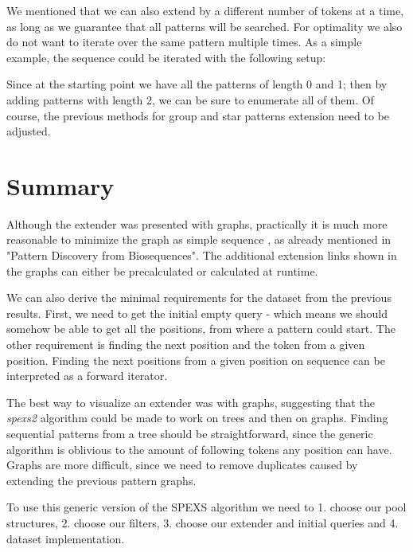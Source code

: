 We mentioned that we can also extend by a different number of tokens at a time, as long as we guarantee that all patterns will be searched. For optimality we also do not want to iterate over the same pattern multiple times. As a simple example, the sequence  could be iterated with the following setup:

\begin{figure}[H]
	
\end{figure}

Since at the starting point we have all the patterns of length 0 and 1; then by adding patterns with length 2, we can be sure to enumerate all of them. Of course, the previous methods for group and star patterns extension need to be adjusted.

\section{Summary}

Although the extender was presented with graphs, practically it is much more reasonable to minimize the graph as simple sequence , as already mentioned in "Pattern Discovery from Biosequences"\cite{spexs}. The additional extension links shown in the graphs can either be precalculated or calculated at runtime.

We can also derive the minimal requirements for the dataset from the previous results. First, we need to get the initial empty query - which means we should somehow be able to get all the positions, from where a pattern could start. The other requirement is finding the next position and the token from a given position. Finding the next positions from a given position on sequence can be interpreted as a forward iterator.

The best way to visualize an extender was with graphs, suggesting that the \emph{spexs2} algorithm could be made to work on trees and then on graphs. Finding sequential patterns from a tree should be straightforward, since the generic algorithm is oblivious to the amount of following tokens any position can have. Graphs are more difficult, since we need to remove duplicates caused by extending the previous pattern graphs\cite{SubgraphIsomorphism}.

To use this generic version of the SPEXS algorithm we need to 1. choose our pool structures, 2. choose our filters, 3. choose our extender and initial queries and 4. dataset implementation.
